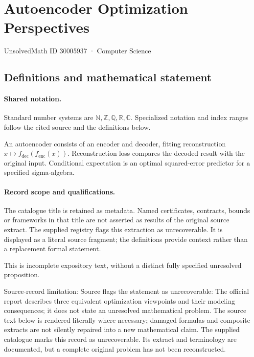 \documentclass[11pt]{article}
\begin{document}
\setcounter{section}{30005936}
\section{Autoencoder Optimization Perspectives}\label{30005937}
{\small\sffamily UnsolvedMath ID 30005937 · Computer Science}
\subsection{Definitions and mathematical statement}

\paragraph{Shared notation.}Standard number systems are $\mathbb N,\mathbb Z,\mathbb Q,\mathbb R,\mathbb C$. Specialized notation and index ranges follow the cited source and the definitions below.


An autoencoder consists of an encoder and decoder, fitting reconstruction $x\mapsto f_{\mathrm{dec}}(f_{\mathrm{enc}}(x))$. Reconstruction loss compares the decoded result with the original input. Conditional expectation is an optimal squared-error predictor for a specified sigma-algebra.
\paragraph{Record scope and qualifications.}
The catalogue title is retained as metadata. Named certificates, contracts, bounds or frameworks in that title are not asserted as results of the original source extract.
The supplied registry flags this extraction as unrecoverable. It is displayed as a literal source fragment; the definitions provide context rather than a replacement formal statement.

This is incomplete expository text, without a distinct fully specified unresolved proposition.

Source-record limitation: Source flags the statement as unrecoverable: The official report describes three equivalent optimization viewpoints and their modeling consequences; it does not state an unresolved mathematical problem.
The source text below is rendered literally where necessary; damaged formulas and composite extracts are not silently repaired into a new mathematical claim.
The supplied catalogue marks this record as unrecoverable. Its extract and terminology are documented, but a complete original problem has not been reconstructed.
\end{document}
